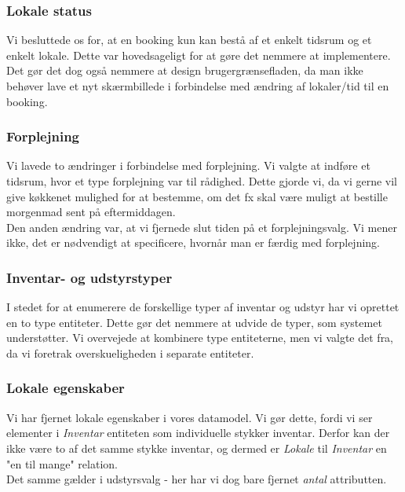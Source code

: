 \subsubsection{Lokale status}
\label{Technical_Database_changes_roomStatus}
Vi besluttede os for, at en booking kun kan bestå af et enkelt tidsrum og et enkelt lokale. Dette var hovedsageligt for at gøre det nemmere at implementere. Det gør det dog også nemmere at design brugergrænsefladen, da man ikke behøver lave et nyt skærmbillede i forbindelse med ændring af lokaler/tid til en booking.

\subsubsection{Forplejning}
\label{Technical_Database_changes_catering}
Vi lavede to ændringer i forbindelse med forplejning. Vi valgte at indføre et tidsrum, hvor et type forplejning var til rådighed. Dette gjorde vi, da vi gerne vil give køkkenet mulighed for at bestemme, om det fx skal være muligt at bestille morgenmad sent på eftermiddagen.
\\Den anden ændring var, at vi fjernede slut tiden på et forplejningsvalg. Vi mener ikke, det er nødvendigt at specificere, hvornår man er færdig med forplejning.

\subsubsection{Inventar- og udstyrstyper}
\label{Technical_Database_changes_types}
I stedet for at enumerere de forskellige typer af inventar og udstyr har vi oprettet en to type entiteter. Dette gør det nemmere at udvide de typer, som systemet understøtter. Vi overvejede at kombinere type entiteterne, men vi valgte det fra, da vi foretrak overskueligheden i separate entiteter.

\subsubsection{Lokale egenskaber}
\label{Technical_Database_changes_roomProperties}
Vi har fjernet lokale egenskaber i vores datamodel. Vi gør dette, fordi vi ser elementer i \textit{Inventar} entiteten som individuelle stykker inventar. Derfor kan der ikke være to af det samme stykke inventar, og dermed er \textit{Lokale} til \textit{Inventar} en "en til mange" relation.
\\Det samme gælder i udstyrsvalg - her har vi dog bare fjernet \textit{antal} attributten.

